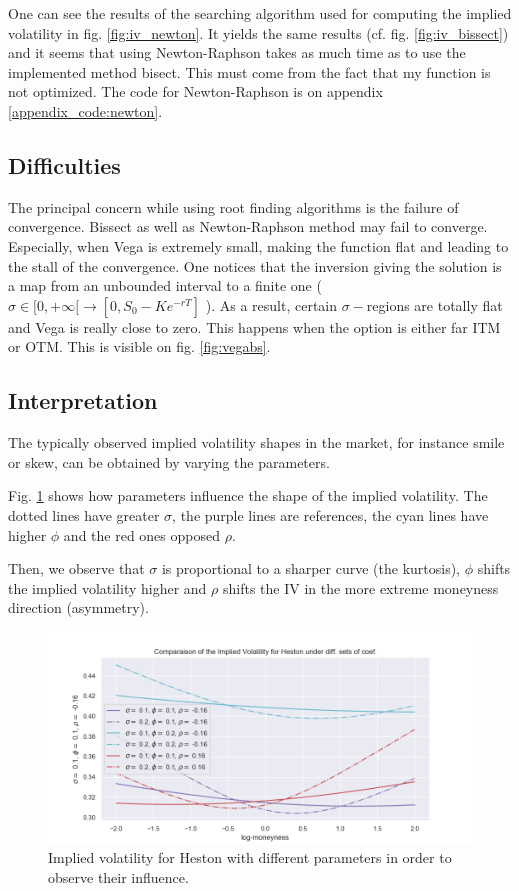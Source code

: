 One can see the results of the searching algorithm used for computing the implied volatility in fig. \ref{fig:iv_newton}. It yields the same results (cf. fig. \ref{fig:iv_bissect}) and it seems that using Newton-Raphson takes as much time as to use the implemented method bisect. This must come from the fact that my function is not optimized. The code for Newton-Raphson is on appendix \ref{appendix_code:newton}.

\subsection{Difficulties}
\label{diff_vega}

The principal concern while using root finding algorithms is the failure of convergence. Bissect as well as Newton-Raphson method may fail to converge. Especially, when Vega is extremely small, making the function flat and leading to the stall of the convergence. One notices that the inversion giving the solution is a map from an unbounded interval to a finite one ( $\sigma \in [0, + \infty[ \to [0, S_0 - K e^{-rT} ]$ ). As a result, certain $\sigma-$regions are totally flat and Vega is really close to zero. This happens when the option is either far ITM or OTM. This is visible on fig. \ref{fig:vegabs}.

\subsection{Interpretation}

The typically observed implied volatility shapes in the market, for instance smile or skew, can be obtained by varying the parameters. 

Fig. \ref{fig:diff_sets_param} shows how parameters influence the shape of the implied volatility. The dotted lines have greater $\sigma$, the purple lines are references, the cyan lines have higher $\phi$ and the red ones opposed $\rho$. 

Then, we observe that $\sigma$ is proportional to a sharper curve (the kurtosis), $\phi$ shifts the implied volatility higher and $\rho$ shifts the IV in the more extreme moneyness direction (asymmetry).

\begin{figure}
\centering
   \includegraphics[width = 0.9 \textwidth]{../addition_part/images/integration_fft/comparaison_IV.png}
   \caption{Implied volatility for Heston with different parameters in order to observe their influence.}
   \label{fig:diff_sets_param}
\end{figure}






